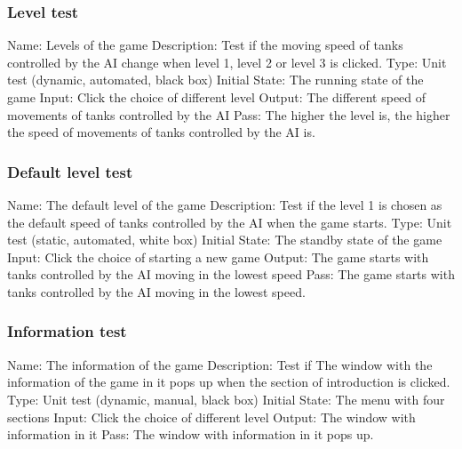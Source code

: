 \documentclass{article}
\begin{document}
\subsubsection{Level test}
Name:  Levels of the game\newline
Description: Test if the moving speed of tanks controlled by the AI change 
when level 1, level 2 or level 3 is clicked. \newline
Type: Unit test (dynamic, automated, black box) \newline
Initial State:  The running state of the game \newline
Input: Click the choice of different level\newline
Output: The different speed of movements of tanks controlled by the AI \newline
Pass: The higher the level is, the higher the speed of movements of tanks 
controlled by the AI is. \newline

\subsubsection{Default level test}
Name:  The default level of the game\newline
Description: Test if the level 1 is chosen as the default speed of tanks 
controlled by the AI when the game starts. \newline
Type: Unit test (static, automated, white box) \newline
Initial State: The standby state of the game \newline
Input: Click the choice of starting a new game\newline
Output: The game starts with tanks controlled by the AI moving in the lowest 
speed\newline
Pass: The game starts with tanks controlled by the AI moving in the lowest 
speed. \newline

\subsubsection{Information test}
Name:  The information of the game\newline
Description: Test if The window with the information of the game in it pops up 
when the section of introduction is clicked. \newline
Type: Unit test (dynamic, manual, black box) \newline
Initial State:  The menu with four sections \newline
Input: Click the choice of different level\newline
Output: The window with information in it \newline
Pass:  The window with information in it pops up. \newline
\end{document}

